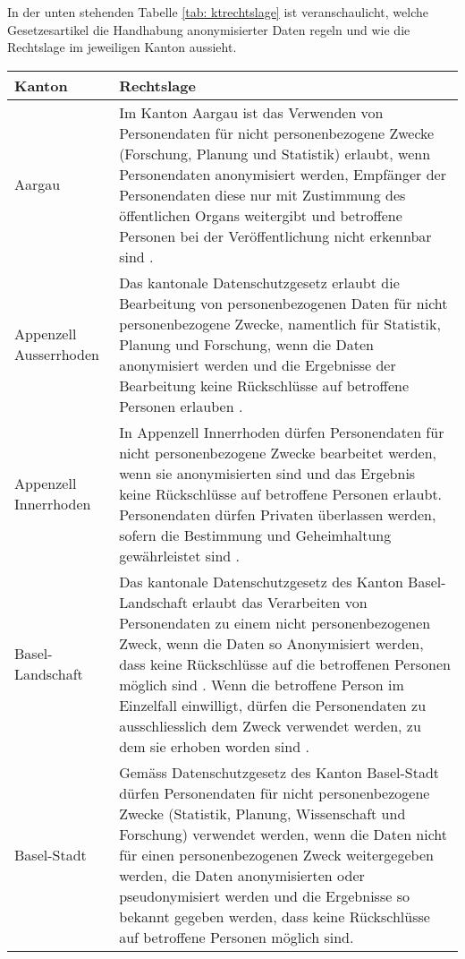 In der unten stehenden Tabelle \ref{tab: ktrechtslage} ist veranschaulicht, welche Gesetzesartikel die Handhabung anonymisierter Daten regeln und wie die Rechtslage im jeweiligen Kanton aussieht.

\begin{longtable}{| p{} | p{}|} 
		\hline
		\textbf{Kanton} & \textbf{Rechtslage}  \\ 
    \hline
    Aargau & Im Kanton Aargau ist das Verwenden von Personendaten für nicht personenbezogene Zwecke (Forschung, Planung und Statistik) erlaubt, wenn Personendaten anonymisiert werden, Empfänger der Personendaten diese nur mit Zustimmung des öffentlichen Organs weitergibt und betroffene Personen bei der Veröffentlichung nicht erkennbar sind \parencite[§§ 19 Abs. 1]{DSSGAARGAU}. \\
    \hline
		Appenzell Ausserrhoden & Das kantonale Datenschutzgesetz erlaubt die Bearbeitung von personenbezogenen Daten für nicht personenbezogene Zwecke, namentlich für Statistik, Planung und Forschung, wenn die Daten anonymisiert werden und die Ergebnisse der Bearbeitung keine Rückschlüsse auf betroffene Personen erlauben \parencite[§§ 14 Abs. 1]{DSSGAARh}. \\
    \hline
		Appenzell Innerrhoden & In Appenzell Innerrhoden dürfen Personendaten für nicht personenbezogene Zwecke bearbeitet werden, wenn sie anonymisierten sind und das Ergebnis keine Rückschlüsse auf betroffene Personen erlaubt. Personendaten dürfen Privaten überlassen werden, sofern die Bestimmung und Geheimhaltung gewährleistet sind \parencite[§§ 7 Abs 1-2]{DSSGAIRh}.\\
    \hline
		Basel-Landschaft & Das kantonale Datenschutzgesetz des Kanton Basel-Landschaft erlaubt das Verarbeiten von Personendaten zu einem nicht personenbezogenen Zweck, wenn die Daten so Anonymisiert werden, dass keine Rückschlüsse auf die betroffenen Personen möglich sind \parencite[§§ 11 Abs. 2]{DSSGBL}. Wenn die betroffene Person im Einzelfall einwilligt, dürfen die Personendaten zu ausschliesslich dem Zweck verwendet werden, zu dem sie erhoben worden sind \parencite[§§ 11 Abs. 1]{DSSGBL}. \\
		\hline
		Basel-Stadt &  Gemäss Datenschutzgesetz des Kanton Basel-Stadt \parencite[§§ 10 Abs. 1]{DSSGBS} dürfen Personendaten für nicht personenbezogene Zwecke (Statistik, Planung, Wissenschaft und Forschung) verwendet werden, wenn die Daten nicht für einen personenbezogenen Zweck weitergegeben werden, die Daten anonymisierten oder pseudonymisiert werden und die Ergebnisse so bekannt gegeben werden, dass keine Rückschlüsse auf betroffene Personen möglich sind. \\

\end{longtable}
